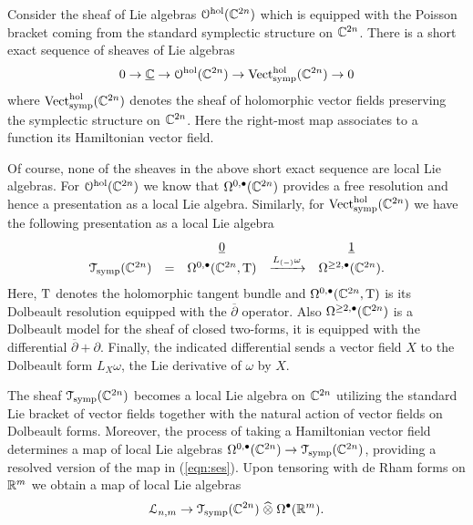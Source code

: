 \documentclass[11pt, oneside, reqno]{amsart}
\theoremstyle{definition} \newtheorem{definition}{Definition}[section]
\theoremstyle{definition}
\theoremstyle{remark}
\theoremstyle{definition} \newtheorem{remark}[definition]{Remark}
\theoremstyle{definition} \newtheorem{remarks}[definition]{Remarks}
\theoremstyle{definition} \newtheorem{question}[definition]{Question}
\theoremstyle{definition} \newtheorem*{note}{Note}
\theoremstyle{definition} \newtheorem{example}[definition]{Example}
\theoremstyle{definition} \newtheorem{examples}[definition]{Examples}
\def\bu{\bullet}
\def\Hat{\widehat}
\def\xto{\xrightarrow}
\newcommand{\dbar}{\overline{\partial}}
\newcommand{\ul}[1]{\underline{#1}}
\begin{document}
Consider the sheaf of Lie algebras $\mathcal O^{\rm hol} (\mathbb C^{2n})$ which is equipped with the Poisson bracket coming from the standard symplectic structure on $\mathbb C^{2n}$. 
There is a short exact sequence of sheaves of Lie algebras
\begin{equation}\label{eqn:ses}
0 \to \ul{\CC} \to \cO^{\rm hol}(\CC^{2n}) \to {\rm Vect}^{\rm hol}_{\rm symp}(\CC^{2n}) \to 0
\end{equation}
where ${\rm Vect}^{\rm hol}_{\rm symp}(\mathbb C^{2n})$ denotes the sheaf of holomorphic vector fields preserving the symplectic structure on $\mathbb C^{2n}$. 
Here the right-most map associates to a function its Hamiltonian vector field. 

Of course, none of the sheaves in the above short exact sequence are local Lie algebras.
For $\mathcal O^{\rm hol}(\mathbb C^{2n})$ we know that $\Omega^{0,\bu}(\CC^{2n})$ provides a free resolution and hence a presentation as a local Lie algebra.
Similarly, for ${\rm Vect}^{\rm hol}_{\rm symp}(\mathbb C^{2n})$ we have the following presentation as a local Lie algebra
\[
\begin{array}{ccccc}
& & \ul{0} & & \ul{1} \\
\cT_{\rm symp}(\CC^{2n}) & = & \Omega^{0,\bu}(\CC^{2n} , {\rm T}) & \xto{L_{(-)} \omega} & \Omega^{\geq 2, \bu} (\CC^{2n}) .
\end{array} 
\]
Here, ${\rm T}$ denotes the holomorphic tangent bundle and $\Omega^{0,\bu}(\CC^{2n}, {\rm T})$ is its Dolbeault resolution equipped with the $\dbar$ operator. 
Also $\Omega^{\geq 2, \bu}(\CC^{2n})$ is a Dolbeault model for the sheaf of closed two-forms, it is equipped with the differential $\dbar + \partial$. 
Finally, the indicated differential sends a vector field $X$ to the Dolbeault form $L_X \omega$, the Lie derivative of $\omega$ by $X$.  

The sheaf $\mathcal T_{\rm symp}(\mathbb C^{2n})$ becomes a local Lie algebra on $\mathbb C^{2n}$ utilizing the standard Lie bracket of vector fields together with the natural action of vector fields on Dolbeault forms. 
Moreover, the process of taking a Hamiltonian vector field determines a map of local Lie algebras $\Omega^{0,\bu}(\CC^{2n}) \to \cT_{\rm symp}(\CC^{2n})$, providing a resolved version of the map in (\ref{eqn:ses}). 
Upon tensoring with de Rham forms on $\mathbb R^m$ we obtain a map of local Lie algebras
\begin{equation}\label{eqn:resolved}
\cL_{n,m} \to \cT_{\rm symp}(\CC^{2n}) \; \Hat{\otimes} \; \Omega^{\bu}(\RR^m) .
\end{equation}
\end{document}
